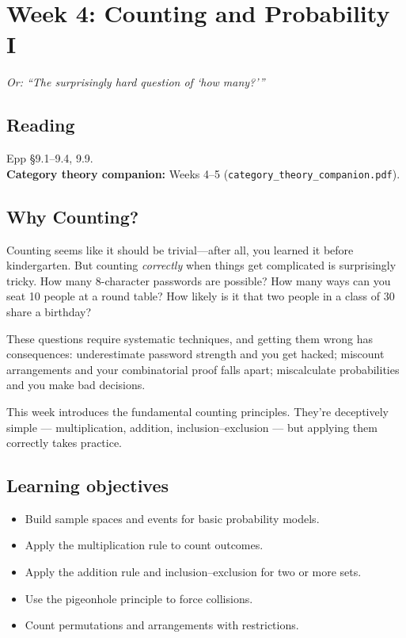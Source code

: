 \section{Week 4: Counting and Probability I}

\textit{Or: ``The surprisingly hard question of `how many?'''}

\subsection*{Reading}
Epp \S 9.1--9.4, 9.9.\\
\textbf{Category theory companion:} Weeks 4--5 (\texttt{category\_theory\_companion.pdf}).

\subsection*{Why Counting?}

Counting seems like it should be trivial---after all, you learned it before kindergarten. But counting \emph{correctly} when things get complicated is surprisingly tricky. How many 8-character passwords are possible? How many ways can you seat 10 people at a round table? How likely is it that two people in a class of 30 share a birthday?

These questions require systematic techniques, and getting them wrong has consequences: underestimate password strength and you get hacked; miscount arrangements and your combinatorial proof falls apart; miscalculate probabilities and you make bad decisions.

This week introduces the fundamental counting principles. They're deceptively simple --- multiplication, addition, inclusion--exclusion --- but applying them correctly takes practice.

\subsection*{Learning objectives}
\begin{itemize}
  \item Build sample spaces and events for basic probability models.
  \item Apply the multiplication rule to count outcomes.
  \item Apply the addition rule and inclusion--exclusion for two or more sets.
  \item Use the pigeonhole principle to force collisions.
  \item Count permutations and arrangements with restrictions.
\end{itemize}

